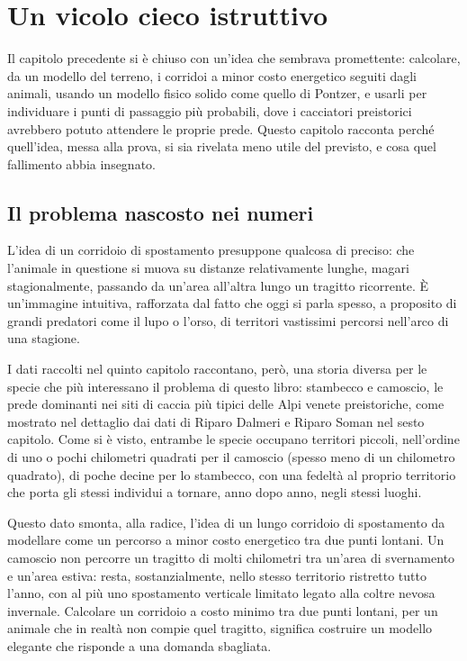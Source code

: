 \chapter{Un vicolo cieco istruttivo}
\label{cap:vicolo_cieco_corridoi}

Il capitolo precedente si è chiuso con un'idea che sembrava promettente: calcolare, da un modello del terreno, i corridoi a minor costo energetico seguiti dagli animali, usando un modello fisico solido come quello di Pontzer, e usarli per individuare i punti di passaggio più probabili, dove i cacciatori preistorici avrebbero potuto attendere le proprie prede. Questo capitolo racconta perché quell'idea, messa alla prova, si sia rivelata meno utile del previsto, e cosa quel fallimento abbia insegnato.

\section{Il problema nascosto nei numeri}

L'idea di un corridoio di spostamento presuppone qualcosa di preciso: che l'animale in questione si muova su distanze relativamente lunghe, magari stagionalmente, passando da un'area all'altra lungo un tragitto ricorrente. È un'immagine intuitiva, rafforzata dal fatto che oggi si parla spesso, a proposito di grandi predatori come il lupo o l'orso, di territori vastissimi percorsi nell'arco di una stagione.

I dati raccolti nel quinto capitolo raccontano, però, una storia diversa per le specie che più interessano il problema di questo libro: stambecco e camoscio, le prede dominanti nei siti di caccia più tipici delle Alpi venete preistoriche, come mostrato nel dettaglio dai dati di Riparo Dalmeri e Riparo Soman nel sesto capitolo. Come si è visto, entrambe le specie occupano territori piccoli, nell'ordine di uno o pochi chilometri quadrati per il camoscio (spesso meno di un chilometro quadrato), di poche decine per lo stambecco, con una fedeltà al proprio territorio che porta gli stessi individui a tornare, anno dopo anno, negli stessi luoghi.

Questo dato smonta, alla radice, l'idea di un lungo corridoio di spostamento da modellare come un percorso a minor costo energetico tra due punti lontani. Un camoscio non percorre un tragitto di molti chilometri tra un'area di svernamento e un'area estiva: resta, sostanzialmente, nello stesso territorio ristretto tutto l'anno, con al più uno spostamento verticale limitato legato alla coltre nevosa invernale. Calcolare un corridoio a costo minimo tra due punti lontani, per un animale che in realtà non compie quel tragitto, significa costruire un modello elegante che risponde a una domanda sbagliata.

